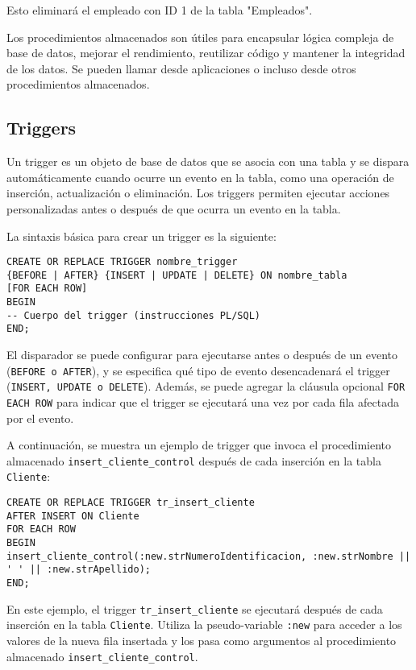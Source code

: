 \documentclass[executivepaper]{article}
\begin{document}
Esto eliminará el empleado con ID 1 de la tabla "Empleados".

Los procedimientos almacenados son útiles para encapsular lógica compleja de base de datos, mejorar el rendimiento, reutilizar código y mantener la integridad de los datos. Se pueden llamar desde aplicaciones o incluso desde otros procedimientos almacenados.

\subsection{Triggers}

Un trigger es un objeto de base de datos que se asocia con una tabla y se dispara automáticamente cuando ocurre un evento en la tabla, como una operación de inserción, actualización o eliminación. Los triggers permiten ejecutar acciones personalizadas antes o después de que ocurra un evento en la tabla.

La sintaxis básica para crear un trigger es la siguiente:

\begin{lstlisting}
CREATE OR REPLACE TRIGGER nombre_trigger
{BEFORE | AFTER} {INSERT | UPDATE | DELETE} ON nombre_tabla
[FOR EACH ROW]
BEGIN
-- Cuerpo del trigger (instrucciones PL/SQL)
END;
\end{lstlisting}

El disparador se puede configurar para ejecutarse antes o después de un evento (\lstinline{BEFORE o AFTER}), y se especifica qué tipo de evento desencadenará el trigger (\lstinline{INSERT, UPDATE o DELETE}). Además, se puede agregar la cláusula opcional \lstinline{FOR EACH ROW} para indicar que el trigger se ejecutará una vez por cada fila afectada por el evento.

A continuación, se muestra un ejemplo de trigger que invoca el procedimiento almacenado \texttt{insert\_cliente\_control} después de cada inserción en la tabla \texttt{Cliente}:

\begin{lstlisting}
CREATE OR REPLACE TRIGGER tr_insert_cliente
AFTER INSERT ON Cliente
FOR EACH ROW
BEGIN
insert_cliente_control(:new.strNumeroIdentificacion, :new.strNombre || ' ' || :new.strApellido);
END;
\end{lstlisting}

En este ejemplo, el trigger \texttt{tr\_insert\_cliente} se ejecutará después de cada inserción en la tabla \texttt{Cliente}. Utiliza la pseudo-variable \texttt{:new} para acceder a los valores de la nueva fila insertada y los pasa como argumentos al procedimiento almacenado \texttt{insert\_cliente\_control}.
\end{document}
